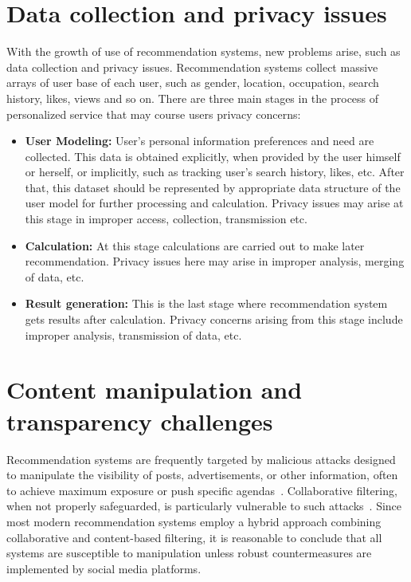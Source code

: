 \documentclass[10pt,twocolumn,twoside,a4paper]{article} %
\begin{document}
\section{Data collection and privacy issues} \label{data_issues}
With the growth of use of recommendation systems, new problems arise, such as data collection and privacy issues.
Recommendation systems collect massive arrays of user base of each user, such as gender, location, occupation, search history, likes, views and so on.
There are three \cite{PrivacyProtectionSurvey} main stages in the process of personalized service that may course users privacy concerns:
\begin{itemize}
    \item \textbf{User Modeling:} User's personal information preferences and need are collected. This data is obtained explicitly, when provided by the user himself or herself, or implicitly, such as tracking user's search history, likes, etc. After that, this dataset should be represented by appropriate data structure of the user model for further processing and calculation. Privacy issues may arise at this stage in improper access, collection, transmission etc.
    \item \textbf{Calculation:} At this stage calculations are carried out to make later recommendation. Privacy issues here may arise in improper analysis, merging of data, etc.
    \item \textbf{Result generation:} This is the last stage where recommendation system gets results after calculation. Privacy concerns arising from this stage include improper analysis, transmission of data, etc.
\end{itemize}

\section{Content manipulation and transparency challenges} \label{content_manipulation}
Recommendation systems are frequently targeted by malicious attacks designed to manipulate the visibility of posts, advertisements, or other information, often to achieve maximum exposure or push specific agendas~\cite{propagandasafety}. Collaborative filtering, when not properly safeguarded, is particularly vulnerable to such attacks~\cite{ManipulationAttacks}. Since most modern recommendation systems employ a hybrid approach combining collaborative and content-based filtering, it is reasonable to conclude that all systems are susceptible to manipulation unless robust countermeasures are implemented by social media platforms.
\end{document}
